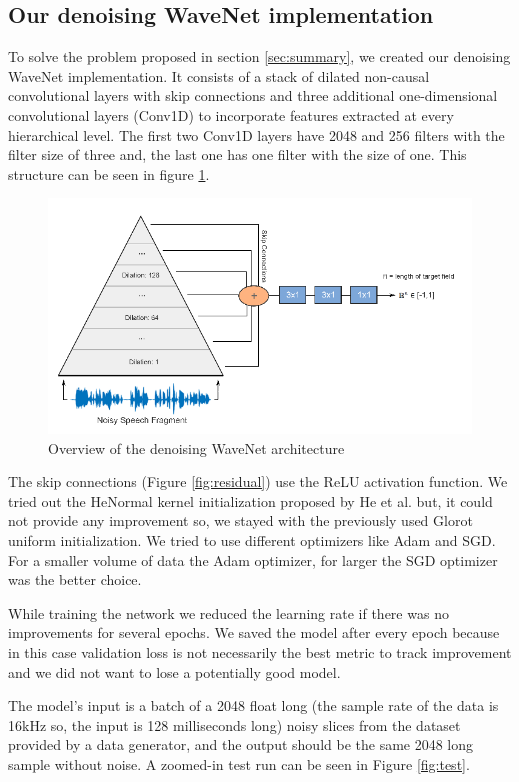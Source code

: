 \documentclass{article}
\begin{document}
	\subsection{Our denoising WaveNet implementation}
	\label{sec:own_wavenet}
	To solve the problem proposed in section \ref{sec:summary}, we created our denoising WaveNet implementation. It consists of a stack of dilated non-causal convolutional layers with skip connections and three additional one-dimensional convolutional layers (Conv1D) to incorporate features extracted at every hierarchical level. The first two Conv1D layers have 2048 and 256 filters with the filter size of three and, the last one has one filter with the size of one. This structure can be seen in figure \ref{fig:own_wavenet}.
	\begin{figure}[htbp]
		\centering
		\includegraphics[width=1\linewidth]{own_wavenet.png}
		\caption{Overview of the denoising WaveNet architecture}
		\label{fig:own_wavenet}
	\end{figure}
	The skip connections (Figure \ref{fig:residual}) use the ReLU activation function. We tried out the HeNormal kernel initialization proposed by He et al. \cite{he2015delving} but, it could not provide any improvement so, we stayed with the previously used Glorot uniform initialization.
	We tried to use different optimizers like Adam and SGD. For a smaller volume of data the Adam optimizer, for larger the SGD optimizer was the better choice.

	While training the network we reduced the learning rate if there was no improvements for several epochs. We saved the model after every epoch because in this case validation loss is not necessarily the best metric to track improvement and we did not want to lose a potentially good model.

	The model's input is a batch of a 2048 float long (the sample rate of the data is 16kHz so, the input is 128 milliseconds long) noisy slices from the dataset provided by a data generator, and the output should be the same 2048 long sample without noise. A zoomed-in test run can be seen in Figure \ref{fig:test}.
	
\end{document}
